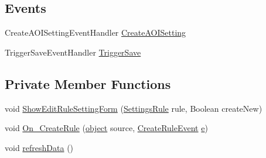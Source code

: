 \subsection*{Events}
\begin{DoxyCompactItemize}
\item 
Create\+A\+O\+I\+Setting\+Event\+Handler \hyperlink{class_web_analyzer_1_1_u_i_1_1_interaction_objects_1_1_a_o_i_setting_control_a655f9d463578bed0ae1ce3243eee82c0}{Create\+A\+O\+I\+Setting}
\item 
Trigger\+Save\+Event\+Handler \hyperlink{class_web_analyzer_1_1_u_i_1_1_interaction_objects_1_1_a_o_i_setting_control_a752fb801d539bc3df62f41bb854074e2}{Trigger\+Save}
\end{DoxyCompactItemize}
\subsection*{Private Member Functions}
\begin{DoxyCompactItemize}
\item 
void \hyperlink{class_web_analyzer_1_1_u_i_1_1_interaction_objects_1_1_a_o_i_setting_control_ae24e397e2156f90970cd5d74b8fde800}{Show\+Edit\+Rule\+Setting\+Form} (\hyperlink{class_web_analyzer_1_1_models_1_1_settings_model_1_1_settings_rule}{Settings\+Rule} rule, Boolean create\+New)
\item 
void \hyperlink{class_web_analyzer_1_1_u_i_1_1_interaction_objects_1_1_a_o_i_setting_control_ac465620c69a2312ef3a901e95890c2ca}{On\+\_\+\+Create\+Rule} (\hyperlink{_u_i_2_h_t_m_l_resources_2js_2lib_2underscore_8min_8js_aae18b7515bb2bc4137586506e7c0c903}{object} source, \hyperlink{class_web_analyzer_1_1_events_1_1_create_rule_event}{Create\+Rule\+Event} \hyperlink{_u_i_2_h_t_m_l_resources_2js_2lib_2bootstrap_8min_8js_ab5902775854a8b8440bcd25e0fe1c120}{e})
\item 
void \hyperlink{class_web_analyzer_1_1_u_i_1_1_interaction_objects_1_1_a_o_i_setting_control_a6a6d45603c57847782b592f6234ab743}{refresh\+Data} ()
\end{DoxyCompactItemize}
